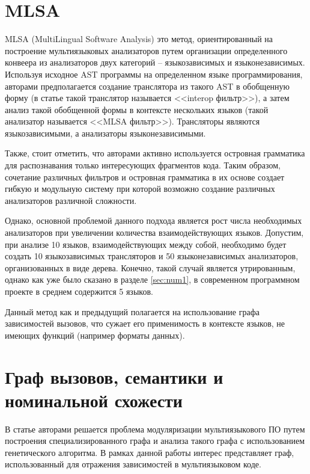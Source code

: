 \section{MLSA} \label{ssec:mlsa}

MLSA (MultiLingual Software Analysis) \cite{MLSA} это метод, ориентированный на построение мультиязыковых анализаторов
путем организации определенного конвеера из анализаторов двух категорий -- языкозависимых и языконезависимых.
Используя исходное AST программы на определенном языке программирования, авторами предполагается
создание транслятора из такого AST в обобщенную форму (в статье такой транслятор называется <<interop фильтр>>),
а затем анализ такой обобщенной формы в контексте нескольких языков (такой анализатор называется <<MLSA фильтр>>).
Трансляторы являются языкозависимыми, а анализаторы языконезависимыми.

Также, стоит отметить, что авторами активно используется островная грамматика \cite{island-grammars} для
распознавания только интересующих фрагментов кода. Таким образом, сочетание различных фильтров и островная грамматика
в их основе создает гибкую и модульную систему при которой возможно создание различных анализаторов различной сложности.

Однако, основной проблемой данного подхода является рост числа необходимых анализаторов при увеличении
количества взаимодействующих языков. Допустим, при анализе 10 языков, взаимодействующих между собой, необходимо
будет создать 10 языкозависимых трансляторов и 50 языконезависимых анализаторов, организованных в виде
дерева. Конечно, такой случай является утрированным, однако как уже было сказано в разделе \ref{sec:num1}, в современном
программном проекте в среднем содержится 5 языков.

Данный метод как и предыдущий полагается на использование графа зависимостей вызовов, что сужает его применимость
в контексте языков, не имеющих функций (например форматы данных).

\section{Граф вызовов, семантики и номинальной схожести} \label{ssec:graphs}

В статье \cite{SNDGA} авторами решается проблема модуляризации мультиязыкового ПО путем построения специализированного графа
и анализа такого графа с использованием генетического алгоритма. В рамках данной работы интерес представляет
граф, использованный для отражения зависимостей в мультиязыковом коде.

